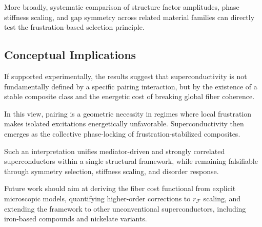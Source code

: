     More broadly,
    systematic comparison of
    structure factor amplitudes,
    phase stiffness scaling,
    and gap symmetry
    across related material families
    can directly test the frustration-based selection principle.

  \subsection{Conceptual Implications}
    \label{subsec:conceptual-implications}

    If supported experimentally,
    the results suggest that superconductivity
    is not fundamentally defined
    by a specific pairing interaction,
    but by the existence of a stable composite class
    and the energetic cost of breaking global fiber coherence.

    In this view,
    pairing is a geometric necessity
    in regimes where local frustration
    makes isolated excitations energetically unfavorable.
    Superconductivity then emerges
    as the collective phase-locking
    of frustration-stabilized composites.

    Such an interpretation unifies mediator-driven
    and strongly correlated superconductors
    within a single structural framework,
    while remaining falsifiable
    through symmetry selection,
    stiffness scaling,
    and disorder response.

    \bigskip
    Future work should aim at
    deriving the fiber cost functional
    from explicit microscopic models,
    quantifying higher-order corrections to $r_{\mathcal F}$ scaling,
    and extending the framework
    to other unconventional superconductors,
    including iron-based compounds and nickelate variants.
